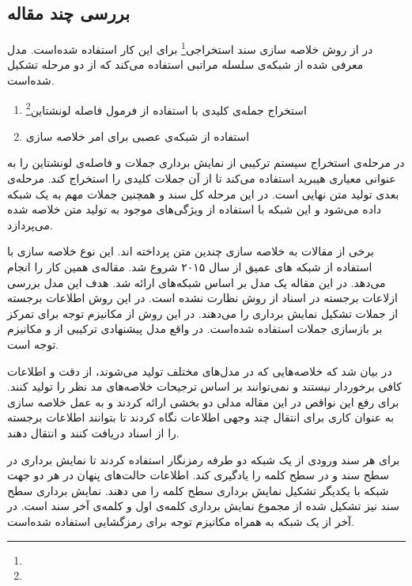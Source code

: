 \documentclass[12pt, a4paper, oneside]{report}
\begin{document}
\subsection{بررسی چند مقاله}

در
\cite{zhang2018extractive}
از روش
خلاصه سازی سند استخراجی\footnote{}
برای این کار استفاده ‌شده‌است. مدل معرفی شده از شبکه‌ی
سلسله مراتبی استفاده می‌کند که از دو مرحله تشکیل شده‌است.

\begin{enumerate}
    \item استخراج جمله‌ی کلیدی با استفاده از فرمول فاصله لونشتاین\footnote{}
    \item استفاده از شبکه‌ی عصبی برای امر خلاصه سازی
\end{enumerate}

در مرحله‌ی استخراج سیستم ترکیبی از نمایش برداری جملات و فاصله‌ی لونشتاین را به عنوانی معیاری
هیبرید استفاده می‌کند تا از آن جملات کلیدی را استخراج کند.
مرحله‌ی بعدی تولید متن نهایی است. در این مرحله کل سند و همچنین جملات مهم به یک شبکه
داده می‌شود و این شبکه با استفاده از ویژگی‌های موجود به تولید متن خلاصه شده می‌پردازد.

برخی از مقالات به خلاصه سازی چندین متن پرداخته اند. این نوع خلاصه سازی
با استفاده از شبکه های عمیق از سال ۲۰۱۵ شروع شد. مقاله‌ی
\cite{li2017cascaded}
همین کار را انجام می‌دهد. در این مقاله یک مدل بر اساس شبکه‌های
ارائه شد. هدف این مدل بررسی ازلاعات برجسته در اسناد از روش نظارت نشده است. 
در این روش اطلاعات برجسته از جملات تشکیل نمایش برداری را می‌دهند.
در این روش از مکانیزم توجه برای تمرکز بر بازسازی جملات استفاده شده‌است.
در واقع مدل پیشنهادی ترکیبی از
و
مکانیزم ‌توجه است.

در
\cite{amplayo2021informative}
بیان شد که خلاصه‌هایی که در مدل‌های مختلف تولید می‌شوند، از دقت و اطلاعات کافی برخوردار نیستند و نمی‌توانند
بر اساس ترجیحات خلاصه‌های مد نظر را تولید کنند. برای رفع این نواقص در این مقاله مدلی دو بخشی ارائه کردند و
به عمل خلاصه سازی به عنوان کاری برای انتقال چند وجهی اطلاعات نگاه کردند تا بتوانند اطلاعات برجسته
را از اسناد دریافت کنند و انتقال دهند.

برای هر سند ورودی از یک شبکه
دو طرفه رمزنگار استفاده کردند تا نمایش برداری در سطح سند و در سطح کلمه را یادگیری کند.
اطلاعات حالت‌های پنهان در هر دو جهت شبکه با یکدیگر تشکیل نمایش برداری سطح کلمه را می دهند.
نمایش برداری سطح سند نیز تشکیل شده از مجموع نمایش برداری کلمه‌ی اول و کلمه‌ی آخر سند است.
در آخر از یک شبکه
به همراه مکانیزم توجه برای رمزگشایی استفاده شده‌است.
\end{document}
